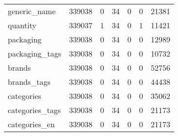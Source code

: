 \begin{tabular}{lrrrrrr}
generic\_name                               &                                        339038 &                                         0 &                                            34 &                                         0 &                      0 &            21381 \\
quantity                                   &                                        339037 &                                         1 &                                            34 &                                         0 &                      1 &            11421 \\
packaging                                  &                                        339038 &                                         0 &                                            34 &                                         0 &                      0 &            12989 \\
packaging\_tags                             &                                        339038 &                                         0 &                                            34 &                                         0 &                      0 &            10732 \\
brands                                     &                                        339038 &                                         0 &                                            34 &                                         0 &                      0 &            52756 \\
brands\_tags                                &                                        339038 &                                         0 &                                            34 &                                         0 &                      0 &            44438 \\
categories                                 &                                        339038 &                                         0 &                                            34 &                                         0 &                      0 &            35062 \\
categories\_tags                            &                                        339038 &                                         0 &                                            34 &                                         0 &                      0 &            21173 \\
categories\_en                              &                                        339038 &                                         0 &                                            34 &                                         0 &                      0 &            21173 \\

\end{tabular}
